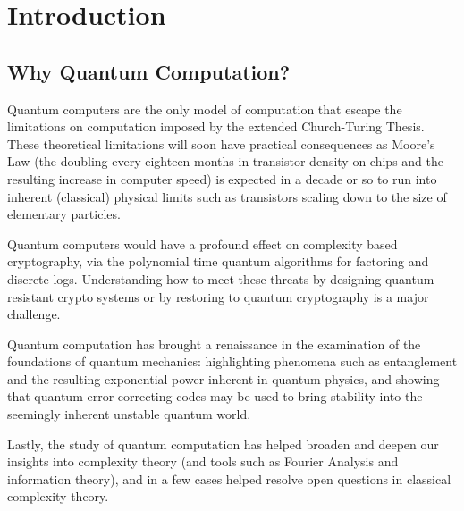 \documentclass[12pt, oneside]{book}
\theoremstyle{definition}
\theoremstyle{definition}
\theoremstyle{remark}
\begin{document}
\mainmatter  %

\chapter{Introduction}
\section{Why Quantum Computation?}
Quantum computers are the only model of computation that escape the limitations on computation imposed by the extended Church-Turing Thesis. These theoretical limitations will soon have practical consequences as Moore's Law (the doubling every eighteen months in transistor density on chips and the resulting increase in computer speed) is expected in a decade or so to run into inherent (classical) physical limits such as transistors scaling down to the size of elementary particles. 

Quantum computers would have a profound effect on complexity based cryptography, via the polynomial time quantum algorithms for factoring and discrete logs. Understanding how to meet these threats by designing quantum resistant crypto systems or by restoring to quantum cryptography is a major challenge.

Quantum computation has brought a renaissance in the examination of the foundations of quantum mechanics: highlighting phenomena such as entanglement and the resulting exponential power inherent in quantum physics, and showing that quantum error-correcting codes may be used to bring stability into the seemingly inherent unstable quantum world.

Lastly, the study of quantum computation has helped broaden and deepen our insights into complexity theory (and tools such as Fourier Analysis and information theory), and in a few cases helped resolve open questions in classical complexity theory.
\end{document}
